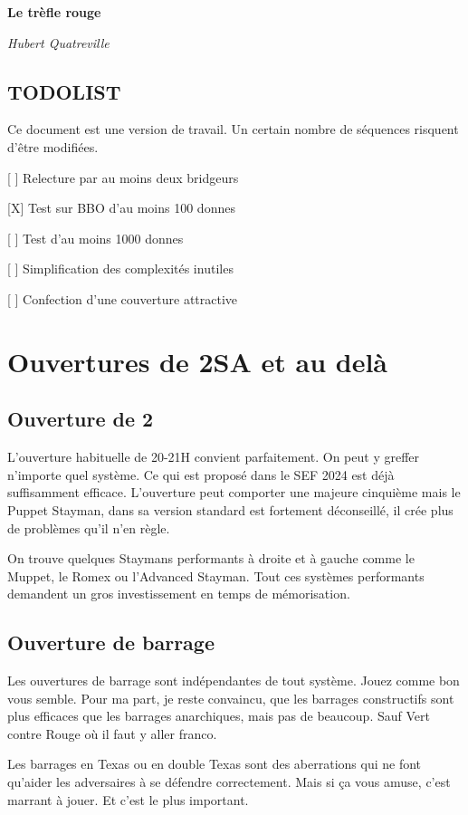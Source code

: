\documentclass[a4paper,12pt, french]{book}
\begin{document}
 \begin{titlepage}
 \centering
 {\huge\bfseries Le trèfle rouge\par}

 {\Large\itshape Hubert Quatreville\par}
 \vfill
\end{titlepage}


\section*{TODOLIST}

Ce document est une version de travail.
Un certain nombre de séquences risquent d'être modifiées.

[ ] Relecture par au moins deux bridgeurs

[X] Test sur BBO d'au moins 100 donnes

[ ] Test d'au moins 1000 donnes

[ ] Simplification des complexités inutiles

[ ] Confection d'une couverture attractive














\chapter{Ouvertures de 2SA et au delà}

\section*{Ouverture de 2\NT}

L'ouverture habituelle de 20-21H convient parfaitement.
On peut y greffer n'importe quel système. Ce qui est proposé dans le SEF 2024 est déjà suffisamment efficace. L'ouverture peut comporter une majeure cinquième mais le Puppet Stayman, dans sa version standard est fortement déconseillé, il crée plus de problèmes qu'il n'en règle.

On trouve quelques Staymans performants à droite et à gauche comme le Muppet, le Romex ou l'Advanced Stayman. Tout ces systèmes performants demandent un gros investissement en temps de mémorisation.

\section*{Ouverture de barrage}

Les ouvertures de barrage sont indépendantes de tout système. Jouez comme bon vous semble. Pour ma part, je reste convaincu, que les barrages constructifs sont plus efficaces que les barrages anarchiques, mais pas de beaucoup. Sauf Vert contre Rouge où il faut y aller franco.

Les barrages en Texas ou en double Texas sont des aberrations qui ne font qu'aider les adversaires à se défendre correctement.
Mais si ça vous amuse, c'est marrant à jouer. Et c'est le plus important.
\end{document}
